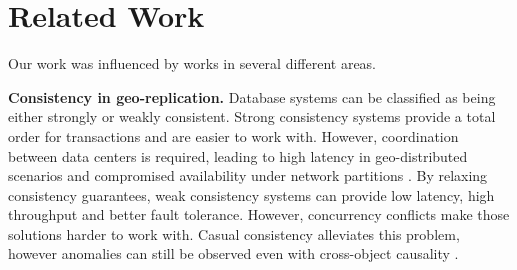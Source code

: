 \documentclass[sigplan,twocolumn,review,anonymous]{acmart}
\begin{document}
\section{Related Work}
\label{sec:related_work}


Our work was influenced by works in several different areas.

\noindent
\textbf{Consistency in geo-replication.}
Database systems can be classified as being either strongly or weakly consistent.
Strong consistency systems \cite{spanner, slog, scatter, krikellas2010strongly, sconekv, lu2021epoch, hildred2023caerus, nguyen2023detock} provide a total order for transactions and are easier to work with.
However, coordination between data centers is required, leading to high latency in geo-distributed scenarios and compromised availability under network partitions \cite{cap}.
By relaxing consistency guarantees, weak consistency systems \cite{dynamo, couchDB, cassandra, chainreaction, cops, riak, eiger} can provide low latency, high throughput and better fault tolerance.
However, concurrency conflicts make those solutions harder to work with.
Casual consistency 
alleviates this problem, however anomalies can still be observed even with cross-object causality \cite{cops, burckhardt2013understanding, ferreira2023antipode}.
\end{document}
